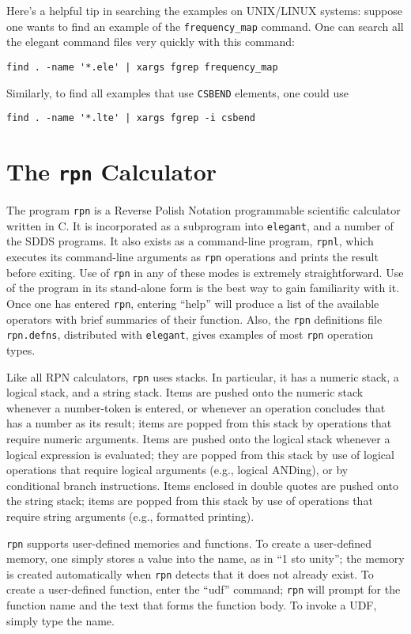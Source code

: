 \documentclass[11pt]{article}
\begin{document}
Here's a helpful tip in searching the examples on UNIX/LINUX systems: suppose one wants
to find an example of the \verb|frequency_map| command.  One can search all the elegant
command files very quickly with this command:
\begin{verbatim}
find . -name '*.ele' | xargs fgrep frequency_map
\end{verbatim}
Similarly, to find all examples that use \verb|CSBEND| elements, one could use
\begin{verbatim}
find . -name '*.lte' | xargs fgrep -i csbend
\end{verbatim}


\newpage
\section{The {\tt rpn} Calculator}

The program {\tt rpn} is a Reverse Polish Notation programmable
scientific calculator written in C.  It is incorporated as a
subprogram into {\tt elegant}, and a number of the SDDS programs.  It
also exists as a command-line program, {\tt rpnl}, which executes its
command-line arguments as {\tt rpn} operations and prints the result
before exiting.  Use of {\tt rpn} in any of these modes is extremely
straightforward.  Use of the program in its stand-alone form is the
best way to gain familiarity with it.  Once one has entered {\tt rpn},
entering ``help'' will produce a list of the available operators with
brief summaries of their function.  Also, the {\tt rpn} definitions
file \verb|rpn.defns|, distributed with {\tt elegant}, gives examples
of most {\tt rpn} operation types.

Like all RPN calculators, {\tt rpn} uses stacks.  In particular, it
has a numeric stack, a logical stack, and a string stack.  Items are
pushed onto the numeric stack whenever a number-token is entered, or
whenever an operation concludes that has a number as its result; items
are popped from this stack by operations that require numeric
arguments.  Items are pushed onto the logical stack whenever a logical
expression is evaluated; they are popped from this stack by use of
logical operations that require logical arguments (e.g., logical
ANDing), or by conditional branch instructions.  Items enclosed in
double quotes are pushed onto the string stack; items are popped from
this stack by use of operations that require string arguments (e.g.,
formatted printing).

{\tt rpn} supports user-defined memories and functions.  To create a
user-defined memory, one simply stores a value into the name, as in
``1 sto unity''; the memory is created automatically when {\tt rpn}
detects that it does not already exist.  To create a user-defined
function, enter the ``udf'' command; {\tt rpn} will prompt for the
function name and the text that forms the function body.  To invoke a
UDF, simply type the name.
\end{document}
